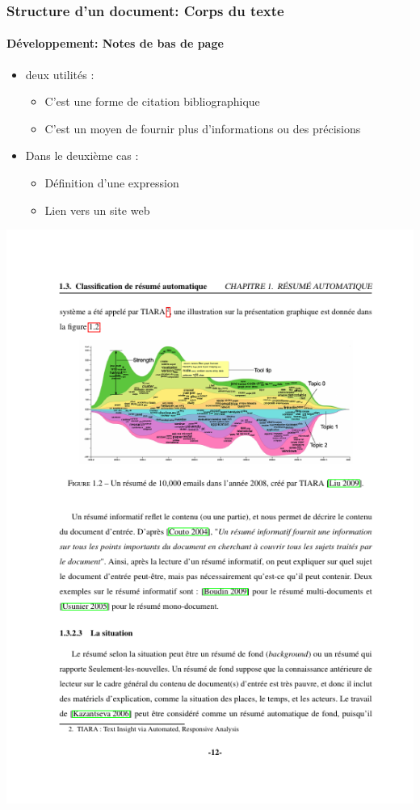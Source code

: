 \documentclass[xcolor=table]{beamer}
\begin{document}
\begin{frame}
\frametitle{Structure d'un document: Corps du texte}
\framesubtitle{Développement: Notes de bas de page}

\begin{minipage}{0.60\textwidth}
	\begin{itemize}
		\item deux utilités :
		
		\begin{itemize}
			\item C'est une forme de citation bibliographique
			\item C'est un moyen de fournir plus d'informations ou des précisions
		\end{itemize}
	
		\item Dans le deuxième cas : 
		
		\begin{itemize}
			\item Définition d'une expression
			\item Lien vers un site web
		\end{itemize}
	\end{itemize}
\end{minipage}
\begin{minipage}{0.38\textwidth}
	\includegraphics[width=\textwidth,frame]{..//img/Bweb03-redaction/dev.png}
\end{minipage}

\end{frame}
\end{document}
